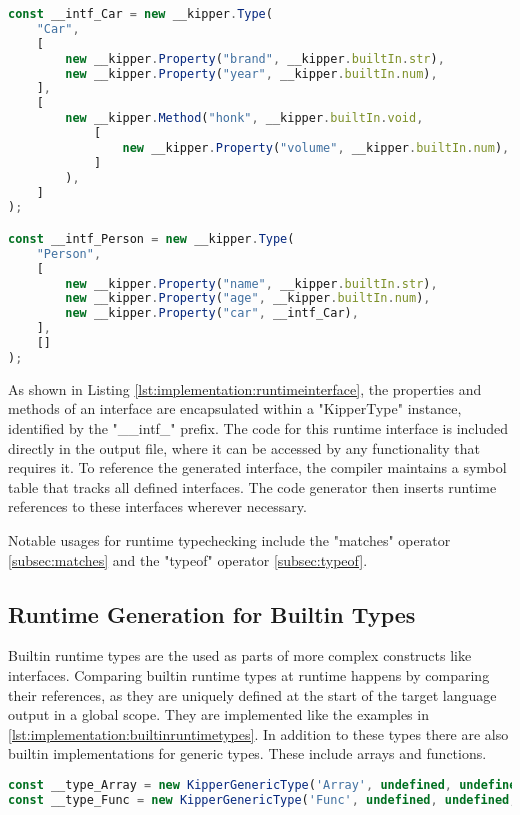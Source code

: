 \begin{lstlisting}[language=Typescript,caption=The runtime representation of the previous interfaces,label=lst:implementation:runtimeinterface]
const __intf_Car = new __kipper.Type(
	"Car",
	[
		new __kipper.Property("brand", __kipper.builtIn.str),
		new __kipper.Property("year", __kipper.builtIn.num),
	],
	[
		new __kipper.Method("honk", __kipper.builtIn.void, 
			[
				new __kipper.Property("volume", __kipper.builtIn.num),
			]
		),
	]
);

const __intf_Person = new __kipper.Type(
	"Person",
	[
		new __kipper.Property("name", __kipper.builtIn.str),
		new __kipper.Property("age", __kipper.builtIn.num),
		new __kipper.Property("car", __intf_Car),
	],
	[]
);
\end{lstlisting}

As shown in Listing \ref{lst:implementation:runtimeinterface}, the properties and methods of an interface are encapsulated within a "KipperType" instance, identified by the "\_\_intf\_" prefix. The code for this runtime interface is included directly in the output file, where it can be accessed by any functionality that requires it. To reference the generated interface, the compiler maintains a symbol table that tracks all defined interfaces. The code generator then inserts runtime references to these interfaces wherever necessary.

Notable usages for runtime typechecking include the "matches" operator \ref{subsec:matches} and the "typeof" operator \ref{subsec:typeof}.

\subsection{Runtime Generation for Builtin Types}

Builtin runtime types are the used as parts of more complex constructs like interfaces. Comparing builtin runtime types at runtime happens by comparing their references, as they are uniquely defined at the start of the target language output in a global scope. They are implemented like the examples in \ref{lst:implementation:builtinruntimetypes}. In addition to these types there are also builtin implementations for generic types. These include arrays and functions.

\begin{lstlisting}[language=Typescript,caption=Generic builtin types,label=lst:implementation:genericbuiltintypes]
const __type_Array = new KipperGenericType('Array', undefined, undefined, {T: __type_any});
const __type_Func = new KipperGenericType('Func', undefined, undefined, {T: [], R: __type_any});	
\end{lstlisting}

